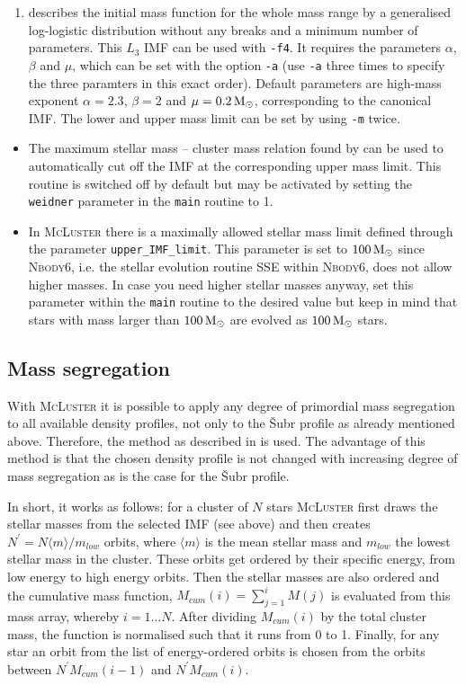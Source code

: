 \documentclass[useAMS,usenatbib]{mn2e}
\newcommand{\msun}{\mbox{$\,{\rm M}_\odot$}}
\begin{document}
\begin{enumerate}
\item \citet{Maschberger12} describes the initial mass function for the whole mass range by a generalised log-logistic distribution  without any breaks and a minimum number of parameters. This $L_3$ IMF can be used with \texttt{-f4}. It requires the parameters $\alpha$, $\beta$ and $\mu$, which can be set with the option \texttt{-a} (use \texttt{-a} three times to specify the three paramters in this exact order). Default parameters are high-mass exponent $\alpha=2.3$, $\beta=2$ and $\mu=0.2 \msun$, corresponding to the canonical \citet{Kroupa01} IMF. The lower and upper mass limit can be set by using \texttt{-m} twice.
\end{enumerate}
\begin{itemize}
\item The  maximum stellar mass -- cluster mass relation found by \citet{Weidner06} can be used to automatically cut off the IMF at the corresponding upper mass limit. This routine is switched off by default but may be activated by setting the \texttt{weidner} parameter in the \texttt{main} routine to 1.
\item In \textsc{McLuster} there is a maximally allowed stellar mass limit defined through the parameter \texttt{upper\_IMF\_limit}. This parameter is set to $100\msun$ since \textsc{Nbody6}, i.e. the stellar evolution routine \textsc{SSE} within \textsc{Nbody6}, does not allow higher masses. In case you need higher stellar masses anyway, set this parameter within the \texttt{main} routine to the desired value but keep in mind that stars with mass larger than $100\msun$ are evolved as $100\msun$ stars.
\end{itemize}

\subsection*{Mass segregation}
With \textsc{McLuster} it is possible to apply any degree of primordial mass segregation to all available density profiles, not only to the {\v S}ubr profile as already mentioned above. Therefore, the method as described in \citet{Baumgardt08a} is used. The advantage of this method is that the chosen density profile is not changed with increasing degree of mass segregation as is the case for the {\v S}ubr profile. 

In short, it works as follows: for a cluster of $N$ stars \textsc{McLuster} first draws the stellar masses from the selected IMF (see above) and then creates $N^\prime = N \langle m\rangle / m_{low}$ orbits, where $\langle m \rangle$ is the mean stellar mass and $m_{low}$ the lowest stellar mass in the cluster. These orbits get ordered by their specific energy, from low energy to high energy orbits. Then the stellar masses are also ordered and the cumulative mass function, $M_{cum}(i) = \sum_{j=1}^i M(j)$ is evaluated from this mass array, whereby $i=1\ldots N$. After dividing $M_{cum}(i)$ by the total cluster mass, the function is normalised such that it runs from 0 to 1. Finally, for any star an orbit from the list of energy-ordered orbits is chosen from the orbits between $N^\prime M_{cum}(i-1)$ and $N^\prime M_{cum}(i)$.
\end{document}
